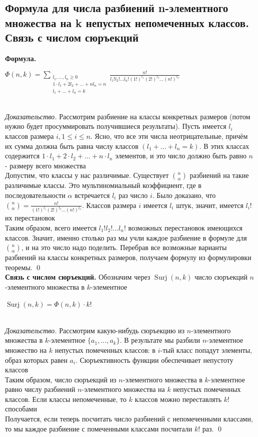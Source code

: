 \documentclass[a4paper]{article}
\begin{document}
\subsection{Формула для числа разбиений n-элементного множества на k непустых непомеченных классов. Связь с числом сюръекций}
\textbf{Формула.}\\[2mm]
\centerline{$\Phi(n,k)=\sum\limits_{\substack{l_1,\ldots,l_n\geqslant0\\1\cdot l_1+2l_2+\ldots+nl_n=n\\l_1+\ldots+l_n=k}} \frac{n!}{l_1!l_2!\ldots l_n!(1!)^{l_1}(2!)^{l_2}\ldots(n!)^{l_n}}$}\\[2mm]
\textit{Доказательство.} Рассмотрим разбиение на классы конкретных размеров (потом нужно будет просуммировать получившиеся результаты). Пусть имеется $l_{i}$ классов размера $i, 1 \leqslant i \leqslant n$. Ясно, что все эти числа неотрицательные, причём их сумма должна быть равна числу классов $\left(l_{1}+\ldots+l_{n}=k\right)$. В этих классах содержится $1 \cdot l_{1}+2 \cdot l_{2}+\ldots+n \cdot l_{n}$ элементов, и это число должно быть равно $n$ - размеру всего множества\\[2mm]
 Допустим, что классы у нас различимые. Существует $\binom{n}{\alpha}$ разбиений на такие различимые классы. Это мультиномиальный коэффициент, где в последовательности $\alpha$ встречается $l_{i}$ раз число $i$. Было доказано, что $\binom{n}{\alpha}=\frac{n !}{(1 !)^{l_{1}}(2 !)^{l_{2}} \ldots(n !)^{l_{n}}}$. Классов размера $i$ имеется $l_{i}$ штук, значит, имеется $l_{i}$! их перестановок\\[2mm]
 Таким образом, всего имеется $l_{1} ! l_{2} ! \ldots l_{n} !$ возможных перестановок имеющихся классов. Значит, именно столько раз мы учли каждое разбиение в формуле для $\binom{n}{\alpha}$, и на это число надо поделить. Перебрав все возможные варианты разбиений на классы конкретных размеров, получаем формулу из формулировки теоремы. \qed\\[2mm]
\textbf{Связь с числом сюръекций.} Обозначим через $\operatorname{Surj}(n, k)$ число сюръекций $n$-элементного множества в $k$-элементное\\[2mm]
\centerline{$\operatorname{Surj}(n, k)=\Phi(n, k) \cdot k$!}\\[2mm]
\textit{Доказательство.} Рассмотрим какую-нибудь сюръекцию из $n$-элементного множества в $k$-элементное $\{a_1,\ldots,a_k\}$. В результате мы разбили $n$-элементное множество на $k$ непустых помеченных классов: в $i$-тый класс попадут элементы, образ которых равен $a_i$. Сюръективность функции обеспечивает непустоту классов\\[2mm]
 Таким образом, число сюръекций из $n$-элементного множества в $k$-элементное равно числу разбиений $n$-элементного множества на $k$ непустых помеченных классов. Если классы непомеченные, то $k$ классов можно переставлять $k!$ способами\\[2mm]
 Получается, если теперь посчитать число разбиений с непомеченными классами, то мы каждое разбиение с помеченными классами посчитали $k!$ раз. \qed
\end{document}

